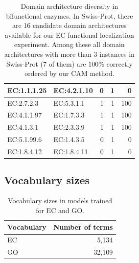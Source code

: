 \begin{table}[htbp]
\begin{tabular}{|l|l|r|r|r|}
  \hline
  EC:1.1.1.25  & EC:4.2.1.10   & 0                                            & 1                                        & 0                                   \\
  \hline
  EC:2.7.2.3   & EC:5.3.1.1    & 1                                            & 1                                        & 100                                 \\
  \hline
  EC:4.1.1.97  & EC:1.7.3.3    & 1                                            & 1                                        & 100                                 \\
  \hline
  EC:4.1.3.1   & EC:2.3.3.9    & 1                                            & 1                                        & 100                                 \\
  \hline
  EC:5.1.99.6  & EC:1.4.3.5    & 0                                            & 1                                        & 0                                  \\
  \hline
  EC:1.8.4.12  & EC:1.8.4.11   & 0                                            & 1                                        & 0                                   \\
  \hline
  \end{tabular}
  \caption{Domain architecture diversity in bifunctional enzymes. In Swiss-Prot, there are 16 candidate domain architectures available for our EC functional localization experiment. Among these all domain architectures with more than 3 instances in Swiss-Prot (7 of them) are 100\% correctly ordered by our CAM method.}
  \end{table}

  \clearpage

  \subsection{Vocabulary sizes}
  \begin{table}[htbp]
    \centering
  \begin{tabular}{|l|r|}
  \hline
  Vocabulary & Number of terms \\
  \hline
  EC & 5,134 \\
  \hline
  GO & 32,109 \\
  \hline
  \end{tabular}
  \caption{Vocabulary sizes in models trained for EC and GO.}
  \label{sup:table:vocab_sizes}
  \end{table}



